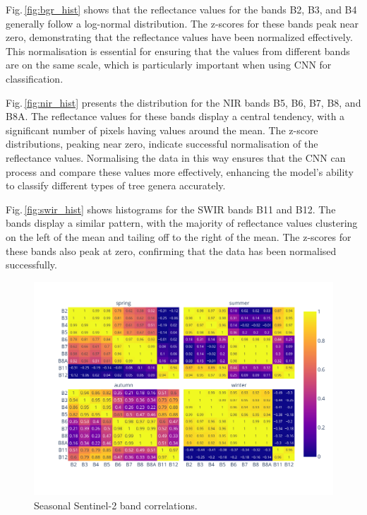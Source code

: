 Fig.\,\ref{fig:bgr_hist} shows that the reflectance values for the bands B2, B3, and B4 generally follow a log-normal distribution. The z-scores for these bands peak near zero, demonstrating that the reflectance values have been normalized effectively. This normalisation is essential for ensuring that the values from different bands are on the same scale, which is particularly important when using CNN for classification.

Fig.\,\ref{fig:nir_hist} presents the distribution for the NIR bands B5, B6, B7, B8, and B8A. The reflectance values for these bands display a central tendency, with a significant number of pixels having values around the mean. The z-score distributions, peaking near zero, indicate successful normalisation of the reflectance values. Normalising the data in this way ensures that the CNN can process and compare these values more effectively, enhancing the model's ability to classify different types of tree genera accurately.

Fig.\,\ref{fig:swir_hist} shows histograms for the SWIR bands B11 and B12. The bands display a similar pattern, with the majority of reflectance values clustering on the left of the mean and tailing off to the right of the mean. The z-scores for these bands also peak at zero, confirming that the data has been normalised successfully. 


\begin{figure}[ht]
    \centering
    \includegraphics[width=0.9\linewidth, trim={40pt 40pt 10pt 30pt}, clip]{figures/figures_features/season_correlation.pdf}
    \caption{Seasonal Sentinel-2 band correlations.}
    \label{fig:season_correlation}
\end{figure}

